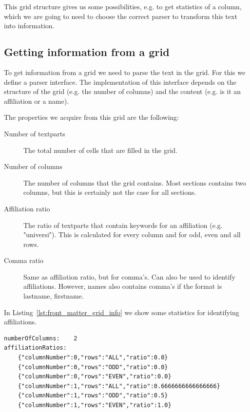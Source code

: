 \documentclass{ou-report}
\begin{document}
This grid structure gives us some possibilities, e.g. to get statistics of a
column, which we are going to need to choose the correct parser to transform
this text into information.

\subsection{Getting information from a grid}
\label{subsec:front_matter_grid_information}
To get information from a grid we need to parse the text in the grid. For 
this we define a parser interface. The implementation of this interface 
depends on the structure of the grid (e.g. the number of columns) and the 
content (e.g. is it an affiliation or a name).

The properties we acquire from this grid are the following:
\begin{description}
    \item[Number of textparts] The total number of cells that are filled in
        the grid.
    \item[Number of columns] The number of columns that the grid contains.
        Most sections contains two columns, but this is certainly not the 
        case for all sections.
    \item[Affiliation ratio] The ratio of textparts that contain keywords 
        for an affiliation (e.g. "universi"). This is calculated for every 
        column and for odd, even and all rows.
    \item[Comma ratio] Same as affiliation ratio, but for comma's. Can also
        be used to identify affiliations. However, names also contains 
        comma's if the format is lastname, firstname.
\end{description}

In Listing~\ref{lst:front_matter_grid_info} we show some statistics for 
identifying affiliations.

\begin{lstlisting}[caption={Some derived information from the grid},captionpos=b,label={lst:front_matter_grid_info}]
numberOfColumns:	2
affiliationRatios:
	{"columnNumber":0,"rows":"ALL","ratio":0.0}
	{"columnNumber":0,"rows":"ODD","ratio":0.0}
	{"columnNumber":0,"rows":"EVEN","ratio":0.0}
	{"columnNumber":1,"rows":"ALL","ratio":0.6666666666666666}
	{"columnNumber":1,"rows":"ODD","ratio":0.5}
	{"columnNumber":1,"rows":"EVEN","ratio":1.0}
\end{lstlisting}
\end{document}
